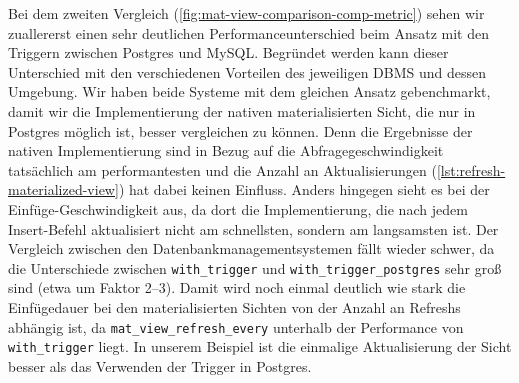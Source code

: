 Bei dem zweiten Vergleich (\ref{fig:mat-view-comparison-comp-metric}) sehen wir zuallererst einen sehr deutlichen Performanceunterschied beim Ansatz mit den Triggern zwischen Postgres und MySQL\@.
Begründet werden kann dieser Unterschied mit den verschiedenen Vorteilen des jeweiligen DBMS und dessen Umgebung.
Wir haben beide Systeme mit dem gleichen Ansatz gebenchmarkt, damit wir die Implementierung der nativen materialisierten Sicht, die nur in Postgres möglich ist, besser vergleichen zu können.
Denn die Ergebnisse der nativen Implementierung sind in Bezug auf die Abfragegeschwindigkeit tatsächlich am performantesten und die Anzahl an Aktualisierungen (\ref{lst:refresh-materialized-view}) hat dabei keinen Einfluss.
Anders hingegen sieht es bei der Einfüge-Geschwindigkeit aus, da dort die Implementierung, die nach jedem Insert-Befehl aktualisiert nicht am schnellsten, sondern am langsamsten ist.
Der Vergleich zwischen den Datenbankmanagementsystemen fällt wieder schwer, da die Unterschiede zwischen \texttt{with\_trigger} und \texttt{with\_trigger\_postgres} sehr groß sind (etwa um Faktor 2--3).
Damit wird noch einmal deutlich wie stark die Einfügedauer bei den materialisierten Sichten von der Anzahl an Refreshs abhängig ist, da \texttt{mat\_view\_refresh\_every} unterhalb der Performance von \texttt{with\_trigger} liegt.
In unserem Beispiel ist die einmalige Aktualisierung der Sicht besser als das Verwenden der Trigger in Postgres.

